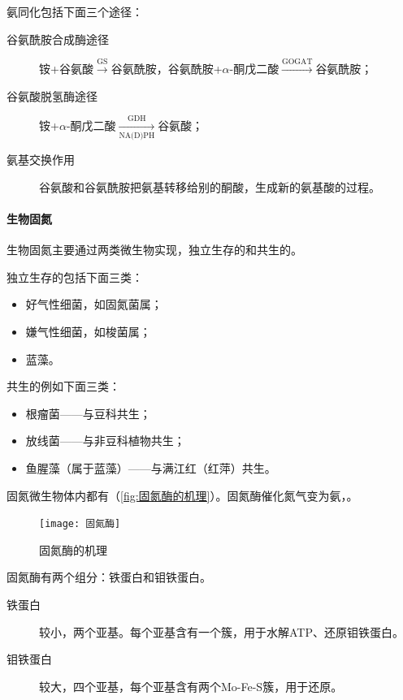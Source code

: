 氨同化包括下面三个途径：

\begin{description}
	\item[谷氨酰胺合成酶途径] 铵+谷氨酸$\xrightarrow{\text{GS}}$谷氨酰胺，谷氨酰胺+$\alpha$-酮戊二酸$\xrightarrow{\text{GOGAT}}$谷氨酰胺；
	\item[谷氨酸脱氢酶途径] 铵+$\alpha$-酮戊二酸$\xrightarrow[\text{NA(D)PH}]{\text{GDH}}$谷氨酸；
	\item[氨基交换作用] 谷氨酸和谷氨酰胺把氨基转移给别的酮酸，生成新的氨基酸的过程。
\end{description}

\paragraph{生物固氮}

生物固氮主要通过两类微生物实现，独立生存的和共生的。

独立生存的包括下面三类：

\begin{itemize}
	\item 好气性细菌，如固氮菌属；
	\item 嫌气性细菌，如梭菌属；
	\item 蓝藻。
\end{itemize}

共生的例如下面三类：

\begin{itemize}
	\item 根瘤菌——与豆科共生；
	\item 放线菌——与非豆科植物共生；
	\item 鱼腥藻（属于蓝藻）——与满江红（红萍）共生。
\end{itemize}

固氮微生物体内都有（\autoref{fig:固氮酶的机理}）。固氮酶催化氮气变为氨，。

\begin{figure}[htbp]
	\centering
	\texttt{[image: 固氮酶]}
	\caption{固氮酶的机理}
	\label{fig:固氮酶的机理}
\end{figure}


固氮酶有两个组分：铁蛋白和钼铁蛋白。

\begin{description}
	\item[铁蛋白] 较小，两个亚基。每个亚基含有一个簇，用于水解ATP、还原钼铁蛋白。
	\item[钼铁蛋白] 较大，四个亚基，每个亚基含有两个Mo-Fe-S簇，用于还原。
\end{description}

